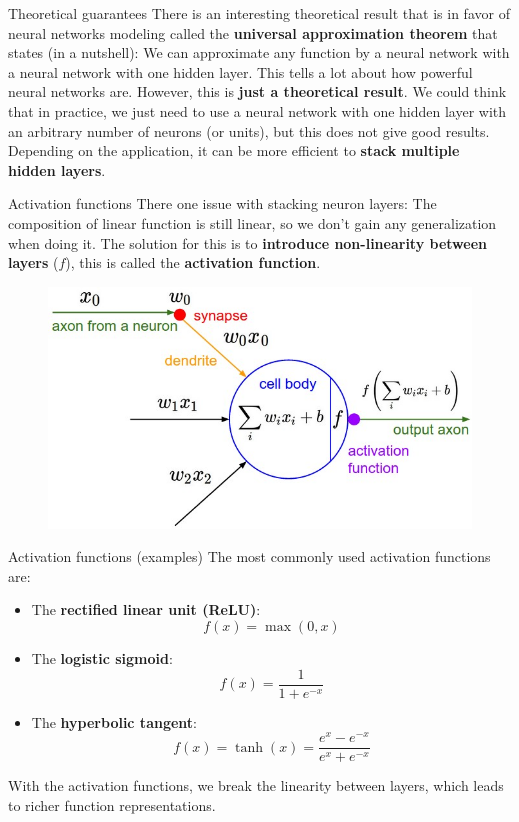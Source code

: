 \documentclass{beamer}
\newcommand{\1}[1]{\mathbbm{1}\left[#1\right]}
\newcommand{\pv}{\pause\vfill}
\begin{document}
\begin{frame}{Theoretical guarantees}
There is an interesting theoretical result that is in favor of neural networks modeling called the \textbf{universal approximation theorem} that states (in a nutshell):
\pv
We can approximate any function by a neural network with a neural network with one hidden layer.
\pv
This tells a lot about how powerful neural networks are. However, this is \textbf{just a theoretical result}. We could think that in practice, we just need to use a neural network with one hidden layer with an arbitrary number of neurons (or units), but this does not give good results. Depending on the application, it can be more efficient to \textbf{stack multiple hidden layers}.
\end{frame}

\begin{frame}{Activation functions}
There one issue with stacking neuron layers: The composition of linear function is still linear, so we don't gain any generalization when doing it.
\pv
The solution for this is to \textbf{introduce non-linearity between layers} ($f$), this is called the \textbf{activation function}.
\begin{figure}
\centering
\includegraphics[width=\textwidth]{images/neuron_model.jpeg}
\end{figure}
\end{frame}

\begin{frame}{Activation functions (examples)}
The most commonly used activation functions are:
\begin{itemize}
	\item The \textbf{rectified linear unit (ReLU)}:
	$$ f(x) = \max(0, x)$$
	\pv
	\item The \textbf{logistic sigmoid}:
	$$ f(x) = \dfrac{1}{1 + e^{-x}}$$
	\pv
	\item The \textbf{hyperbolic tangent}:
	$$ f(x) = \tanh(x) = \dfrac{e^x - e^{-x}}{e^x + e^{-x}}$$
\end{itemize}
\pv
With the activation functions, we break the linearity between layers, which leads to richer function representations.
\end{frame}
\end{document}

